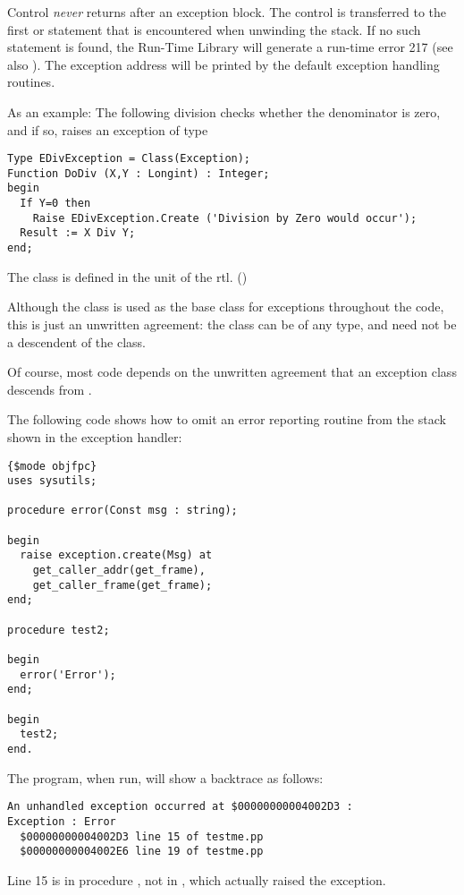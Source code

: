 \begin{remark} Control {\em never} returns after an exception block. The
control is transferred to the first  or
 statement that is encountered when unwinding the stack.
If no such statement is found, the \fpc Run-Time Library will generate a
run-time error 217 (see also ). The exception address
will be printed by the default exception handling routines.
\end{remark}

As an example: The following division checks whether the denominator is
zero, and if so, raises an exception of type 
\begin{verbatim}
Type EDivException = Class(Exception);
Function DoDiv (X,Y : Longint) : Integer;
begin
  If Y=0 then
    Raise EDivException.Create ('Division by Zero would occur');
  Result := X Div Y;
end;
\end{verbatim}
The class  is defined in the  unit of the rtl.
()

\begin{remark}
Although the  class is used as the base class for exceptions
throughout the code, this is just an unwritten agreement: the class can
be of any type, and need not be a descendent of the  class.

Of course, most code depends on the unwritten agreement that an exception
class descends from .
\end{remark}

The following code shows how to omit an error reporting routine from the
stack shown in the exception handler:
\begin{verbatim}
{$mode objfpc}
uses sysutils;

procedure error(Const msg : string);

begin
  raise exception.create(Msg) at 
    get_caller_addr(get_frame),
    get_caller_frame(get_frame);
end;

procedure test2;

begin
  error('Error');
end;

begin
  test2;
end.
\end{verbatim}
The program, when run, will show a backtrace as follows:
\begin{verbatim}
An unhandled exception occurred at $00000000004002D3 :
Exception : Error
  $00000000004002D3 line 15 of testme.pp
  $00000000004002E6 line 19 of testme.pp
\end{verbatim}
Line 15 is in procedure , not in , which actually raised the exception.

